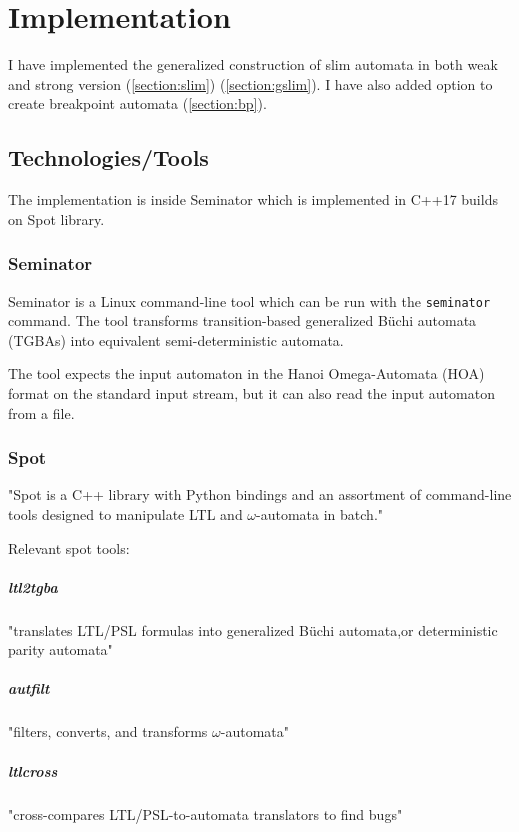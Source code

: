 \documentclass[
	digital,
nolof, nolot
]{fithesis3}
\begin{document}
			
	\chapter{Implementation}
		I have implemented the generalized construction of slim automata in both weak and strong version  (\ref{section:slim}) (\ref{section:gslim}). I have also added option to create breakpoint automata (\ref{section:bp}).
		
		\section{Technologies/Tools}
		The implementation is inside Seminator which is implemented in C++17 builds on Spot library. %
		\subsection{Seminator} 
		Seminator is a Linux command-line tool which can be run with the \texttt{seminator} command. The tool transforms transition-based generalized Büchi automata (TGBAs) into equivalent semi-deterministic automata. \cite{Klokočka2017thesis}\cite{seminator}\cite{seminator2}
		
		
		
		The tool expects the input automaton in the Hanoi Omega-Automata (HOA) format \cite{DBLP:conf/cav/BabiakBDKKM0S15} on the standard input stream, but it can also read the input automaton from a file.
		
	\subsection{Spot}
	"Spot is a C++ library with Python bindings and an assortment of command-line tools designed to manipulate LTL and $\omega$-automata in batch." \cite[Abstract]{spot2}
	
	Relevant spot tools:
	\paragraph{ltl2tgba} "translates LTL/PSL formulas into generalized Büchi automata,or deterministic parity automata" \cite{spot}
	\paragraph{autfilt} "filters, converts, and transforms $\omega$-automata"  \cite{spot}
	\paragraph{ltlcross} "cross-compares LTL/PSL-to-automata translators to find bugs" \cite{spot}
\end{document}
